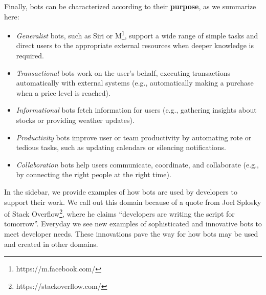 \documentclass{sig-alternate}
\newcommand{\cl}[1]{\textcolor{blue}{{\it [Carly says: #1]}}}
\newcommand{\cl}[1]{}
\begin{document}
Finally, bots can be characterized according to their \textbf{purpose}, as we summarize here: 
\begin{itemize}
\item \emph{Generalist} bots, such as Siri or M\footnote{https://m.facebook.com/}, support a wide range of simple tasks and  direct users to the appropriate external resources when deeper knowledge is required. 
\item \emph{Transactional} bots work on the user's behalf, executing transactions automatically with external systems (e.g., automatically making a purchase when a price level is reached).  
\item \emph{Informational} bots fetch information for users (e.g., gathering insights about stocks or providing weather updates).  
\item \emph{Productivity} bots improve user or team productivity by automating rote or tedious tasks, such as updating calendars or silencing notifications.
\item \emph{Collaboration} bots help users communicate, coordinate, and collaborate (e.g., by connecting the right people at the right time).
\end{itemize}

In the sidebar, we provide examples of how bots are used by developers to support their work. 
We call out this domain because of a quote from Joel Splosky of Stack Overflow\footnote{https://stackoverflow.com/\label{StackOverflow}}, where he claims ``developers are writing the script for tomorrow''. Everyday we see new examples of sophisticated and innovative bots to meet developer needs. These innovations pave the way for how bots may be used and created in other domains.
	
\end{document}
